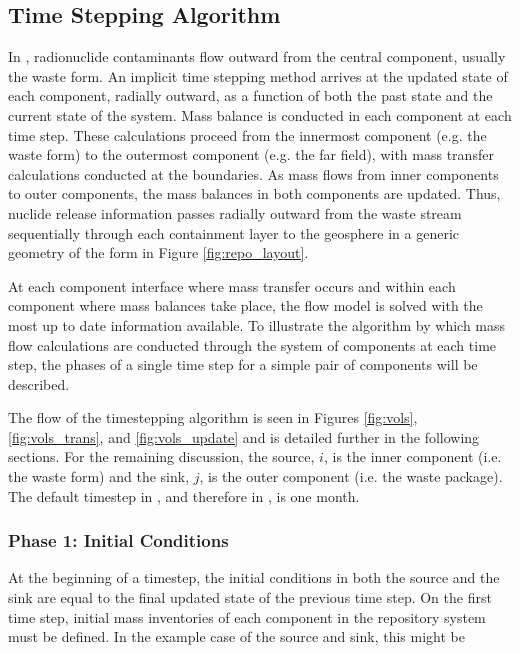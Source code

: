 \subsection{Time Stepping Algorithm}\label{sec:time stepping}

In \Cyder, radionuclide contaminants flow outward from the central component,
usually the waste form. An implicit time stepping method arrives at the updated
state of each component, radially outward, as a function of both the past state
and the current state of the system. Mass balance is conducted in each
component at each time step. These calculations proceed from the innermost
component (e.g. the waste form) to the outermost component (e.g. the far field), with mass transfer calculations conducted
at the boundaries. As mass flows from inner components to outer components, the
mass balances in both components are updated.  Thus, nuclide release
information passes radially outward from the waste stream sequentially through
each containment layer to the geosphere in a generic geometry of the form in
Figure \ref{fig:repo_layout}.

At each component interface where mass transfer occurs and within each component
where mass balances take place, the flow model is solved with the most up to
date information available.  To illustrate the algorithm by which mass flow
calculations are conducted through the system of components at each time step,
the phases of a single time step for a simple pair of components will be
described.

The flow of the timestepping algorithm is seen in Figures \ref{fig:vols}, 
\ref{fig:vols_trans}, and \ref{fig:vols_update} and is detailed further in the 
following sections.  For the remaining discussion, the source, $i$, is the 
inner component (i.e. the waste form) and the sink, $j$, is the outer component 
(i.e. the waste package). The default timestep in \Cyclus, and therefore in 
\Cyder, is one month.



\FloatBarrier


\subsubsection{Phase 1: Initial Conditions}

At the beginning of a timestep, the initial conditions in both the source and
the sink are equal to the final updated state of the previous time step.
On the first time step, initial mass inventories of each component in
the repository system must be defined. In the example case of the source and 
sink, this might be

